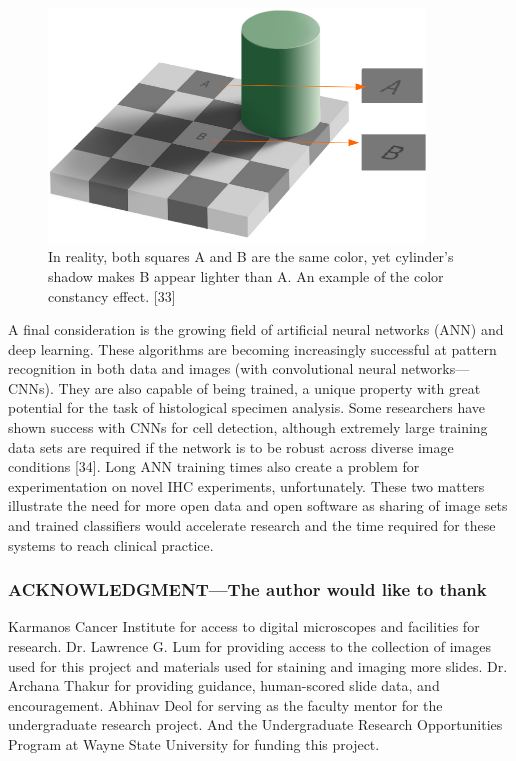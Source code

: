 \documentclass[12pt]{article}
\begin{document}
\begin{figure}[H]
  \centerline{\includegraphics[width=10cm]{13ColorConstancyIllusion.png}}
  \caption{In reality, both squares A and B are the same color, yet
cylinder’s shadow makes B appear lighter than A. An
example of the color constancy effect. [33]}
  \label{fig:Color Constancy Illusion}
\end{figure}


A final consideration is the growing field of artificial neural networks (ANN) and deep learning.
These algorithms are becoming increasingly successful at pattern recognition in both data and images
(with convolutional neural networks---CNNs). They are also capable of being trained, a unique
property with great potential for the task of histological specimen analysis. Some researchers have
shown success with CNNs for cell detection, although extremely large training data sets are required if
the network is to be robust across diverse image conditions [34]. Long ANN training times also create a
problem for experimentation on novel IHC experiments, unfortunately. These two matters illustrate the
need for more open data and open software as sharing of image sets and trained classifiers would
accelerate research and the time required for these systems to reach clinical practice.

\newpage
\subsubsection*{ACKNOWLEDGMENT---The author would like to thank}

Karmanos Cancer Institute for access to digital microscopes and facilities for research. Dr. Lawrence
G. Lum for providing access to the collection of images used for this project and materials used for
staining and imaging more slides. Dr. Archana Thakur for providing guidance, human-scored slide
data, and encouragement. Abhinav Deol for serving as the faculty mentor for the undergraduate
research project. And the Undergraduate Research Opportunities Program at Wayne State University for funding this project.
\end{document}
